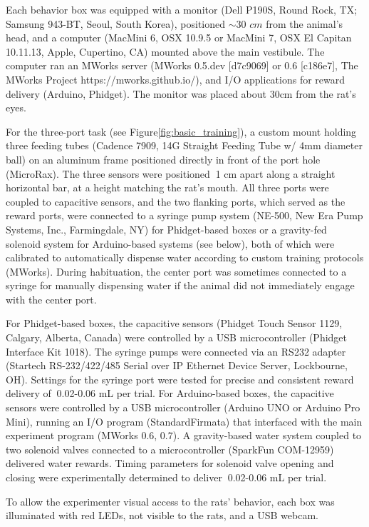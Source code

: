 Each behavior box was equipped with a monitor (Dell P190S, Round Rock, TX; Samsung 943-BT, Seoul, South Korea), positioned $\sim$30 $cm$ from the animal's head, and a computer (MacMini 6, OSX 10.9.5 or MacMini 7, OSX El Capitan 10.11.13, Apple, Cupertino, CA) mounted above the main vestibule. The computer ran an MWorks server (MWorks 0.5.dev [d7c9069] or 0.6 [c186e7], The MWorks Project https://mworks.github.io/), and I/O applications for reward delivery (Arduino\textregistered, Phidget). The monitor was placed about 30cm from the rat's eyes. 

For the three-port task (see Figure\ref{fig:basic_training}), a custom mount holding three feeding tubes (Cadence 7909, 14G Straight Feeding Tube w/ 4mm diameter ball) on an aluminum frame positioned directly in front of the port hole (MicroRax). The three sensors were positioned $~$1 cm apart along a straight horizontal bar, at a height matching the rat's mouth. All three ports were coupled to capacitive sensors, and the two flanking ports, which served as the reward ports, were connected to a syringe pump system (NE-500, New Era Pump Systems, Inc., Farmingdale, NY) for Phidget-based boxes or a gravity-fed solenoid system for Arduino-based systems (see below), both of which were calibrated to automatically dispense water according to custom training protocols (MWorks). During habituation, the center port was sometimes connected to a syringe for manually dispensing water if the animal did not immediately engage with the center port. 

For Phidget-based boxes, the capacitive sensors (Phidget Touch Sensor 1129, Calgary, Alberta, Canada) were controlled by a USB microcontroller (Phidget Interface Kit 1018). The syringe pumps were connected via an RS232 adapter (Startech RS-232/422/485 Serial over IP Ethernet Device Server, Lockbourne, OH). Settings for the syringe port were tested for precise and consistent reward delivery of $~$0.02-0.06 mL per trial. For Arduino-based boxes, the capacitive sensors were controlled by a USB microcontroller (Arduino UNO or Arduino Pro Mini), running an I/O program (StandardFirmata) that interfaced with the main experiment program (MWorks 0.6, 0.7). A gravity-based water system coupled to two solenoid valves connected to a microcontroller (SparkFun COM-12959) delivered water rewards. Timing parameters for solenoid valve opening and closing were experimentally determined to deliver $~$0.02-0.06 mL per trial. 

To allow the experimenter visual access to the rats' behavior, each box was illuminated with red LEDs, not visible to the rats, and a USB webcam. 

